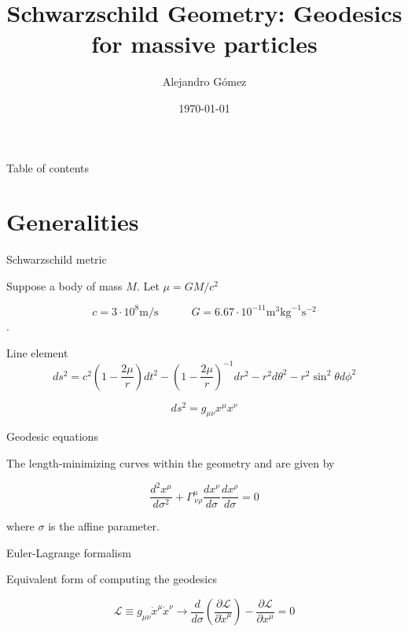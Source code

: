 \documentclass[xcolor=dvipsnames]{beamer}
\title[Schwarzschild geometry]{Schwarzschild Geometry: Geodesics for massive particles}
\date{\today}
\author[Universidad del Valle]{Alejandro Gómez }
\institute[]{Universidad del Valle \\ Departamento de física}
\begin{document}
	
	\begin{frame}
		\titlepage
	\end{frame}
	
	\begin{frame}{Table of contents}
    \tableofcontents
	\end{frame}
	
	
\section{Generalities}

\begin{frame}{Schwarzschild metric}

Suppose a body of mass $M$. Let $\mu = GM/c^2$

$$c = 3\cdot 10^8 \text{m/s} \qquad \quad G = 6.67 \cdot 10^{-11} \text{m}^3 \text{kg}^{-1} \text{s}^{-2}$$.

\begin{block}{Line element}
\begin{equation*}
	ds^2 = c^2 \left( 1 - \frac{2\mu}{r}\right) dt^2 - \left( 1 - \frac{2\mu}{r}\right)^{-1} dr^2 - r^2 d\theta^2 - r^2 \sin^2 \theta d\phi^2
\end{equation*}
\end{block}

\begin{equation*}
    ds^2 = g_{\mu \nu} x^\mu x^\nu
\end{equation*}

\end{frame}


\begin{frame}{Geodesic equations}

The length-minimizing curves within the geometry and are given by

\begin{equation*}
    \frac{d^2 x^\mu}{d\sigma^2} + \Gamma^\mu_{\, \nu \rho} \frac{dx^\nu}{d\sigma} \frac{dx^\rho}{d\sigma} = 0
\end{equation*}

where $\sigma$ is the affine parameter.

\begin{block}{Euler-Lagrange formalism}

Equivalent form of computing the geodesics

\begin{equation*}
	\mathcal{L} \equiv g_{\mu \nu} \dot{x}^\mu \dot{x}^\nu  \longrightarrow \frac{d}{d\sigma} \left( \frac{\partial \mathcal{L}}{\partial \dot{x}^\mu} \right) - \frac{\partial \mathcal{L}}{\partial x^\mu} = 0
\end{equation*}
\end{block}

\end{frame}
\end{document}
